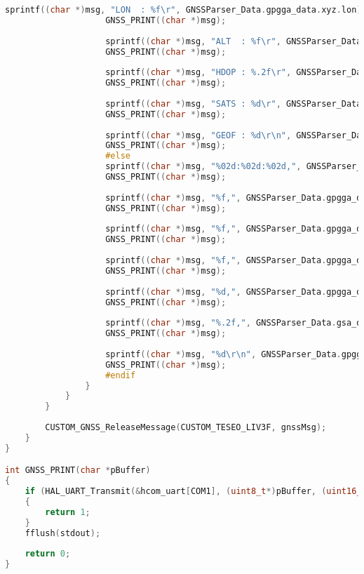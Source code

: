 \begin{lstlisting}[language=c]
					sprintf((char *)msg, "LON  : %f\r", GNSSParser_Data.gpgga_data.xyz.lon);
					GNSS_PRINT((char *)msg);
					
					sprintf((char *)msg, "ALT  : %f\r", GNSSParser_Data.gpgga_data.xyz.alt);
					GNSS_PRINT((char *)msg);
					
					sprintf((char *)msg, "HDOP : %.2f\r", GNSSParser_Data.gsa_data.hdop);
					GNSS_PRINT((char *)msg);
					
					sprintf((char *)msg, "SATS : %d\r", GNSSParser_Data.gpgga_data.sats);
					GNSS_PRINT((char *)msg);
					
					sprintf((char *)msg, "GEOF : %d\r\n", GNSSParser_Data.gpgga_data.xyz.is_inside_ugm);
					GNSS_PRINT((char *)msg);
					#else
					sprintf((char *)msg, "%02d:%02d:%02d,", GNSSParser_Data.gpgga_data.utc.hh, GNSSParser_Data.gpgga_data.utc.mm, GNSSParser_Data.gpgga_data.utc.ss);
					GNSS_PRINT((char *)msg);
					
					sprintf((char *)msg, "%f,", GNSSParser_Data.gpgga_data.xyz.lat);
					GNSS_PRINT((char *)msg);
					
					sprintf((char *)msg, "%f,", GNSSParser_Data.gpgga_data.xyz.lon);
					GNSS_PRINT((char *)msg);
					
					sprintf((char *)msg, "%f,", GNSSParser_Data.gpgga_data.xyz.alt);
					GNSS_PRINT((char *)msg);
					
					sprintf((char *)msg, "%d,", GNSSParser_Data.gpgga_data.sats);
					GNSS_PRINT((char *)msg);
					
					sprintf((char *)msg, "%.2f,", GNSSParser_Data.gsa_data.hdop);
					GNSS_PRINT((char *)msg);
					
					sprintf((char *)msg, "%d\r\n", GNSSParser_Data.gpgga_data.xyz.is_inside_ugm);
					GNSS_PRINT((char *)msg);
					#endif
				}
			}
		}
		
		CUSTOM_GNSS_ReleaseMessage(CUSTOM_TESEO_LIV3F, gnssMsg);
	}
}

int GNSS_PRINT(char *pBuffer)
{
	if (HAL_UART_Transmit(&hcom_uart[COM1], (uint8_t*)pBuffer, (uint16_t)strlen((char *)pBuffer), 1000) != HAL_OK)
	{
		return 1;
	}
	fflush(stdout);
	
	return 0;
}
\end{lstlisting}
